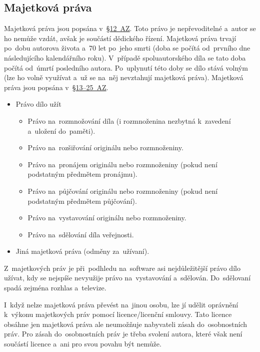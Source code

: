 \subsection{Majetková práva}

Majetková práva jsou popsána v~\href{https://www.zakonyprolidi.cz/cs/2000-121#p12}{§12~AZ}. Toto právo je nepřevoditelné a~autor se ho nemůže vzdát, avšak je součástí dědického řízení.
Majetková práva trvají po~dobu autorova života a~70 let po~jeho smrti (doba se počítá od~prvního dne následujícího kalendářního roku). V~případě spoluautorského díla se tato doba počítá od~úmrtí posledního autora. Po~uplynutí této doby se dílo  stává volným (lze ho volně využívat a~už se na~něj nevztahují majetková práva). Majetková práva jsou popsána v~\href{https://www.zakonyprolidi.cz/cs/2000-121#p13}{§13--25~AZ}.

\begin{itemize}
	\item Právo dílo užít
	      \begin{itemize}
		      \item Právo na~rozmnožování díla (i rozmnoženina nezbytná k~zavedení a~uložení do~paměti).
		      \item Právo na~rozšiřování originálu nebo rozmnoženiny.
		      \item Právo na~pronájem originálu nebo rozmnoženiny (pokud není podstatným předmětem pronájmu).
		      \item Právo na~půjčování originálu nebo rozmnoženiny (pokud není podstatným předmětem půjčování).
		      \item Právo na~vystavování originálu nebo rozmnoženiny.
		      \item Právo na~sdělování díla veřejnosti.
	      \end{itemize}
	\item Jiná majetková práva (odměny za~užívaní).
\end{itemize}

Z~majetkových práv je při~podhledu na~software asi nejdůležitější právo dílo užívat, kdy se nejspíše nevyužije právo na~vystavování a~sdělován. Do~sdělovaní spadá zejména rozhlas a~televize.

I~když nelze majetková práva převést na~jinou osobu, lze jí udělit oprávnění k~výkonu majetkových práv pomocí licence/licenční smlouvy. Tato licence obsáhne jen majetková práva ale neumožňuje nabyvateli zásah do~osobnostních práv. Pro zásah do~osobnostních práv je třeba svolení autora, které však není součástí licence a~ani pro svou povahu být nemůže.

